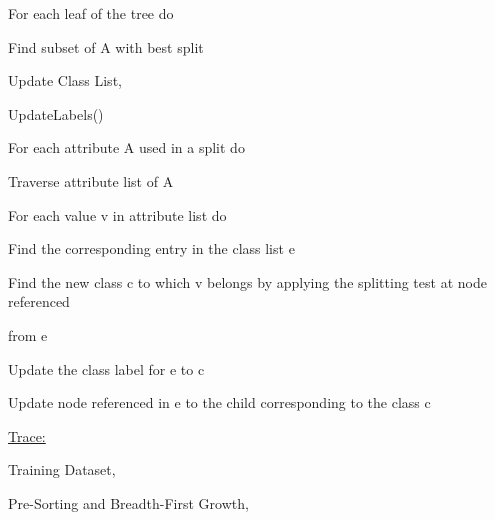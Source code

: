 \documentclass[12pt]{article}
\renewcommand{\_}{\kern-1.5pt\textunderscore\kern-1.5pt}
\begin{document}
\begin{enumerate}
\tab \tab For each leaf of the tree do\par

\tab \tab \tab Find subset of A with best split\par

Update Class List, \par

UpdateLabels()\par

For each attribute A used in a split do\par

\tab Traverse attribute list of A\par

\tab For each value v in attribute list do\par

\tab \tab Find the corresponding entry in the class list e\par

\tab \tab Find the new class c to which v belongs by applying the splitting test at node referenced\par

\begin{adjustwidth}{0.5in}{0.0in}
from e\par

\end{adjustwidth}

\begin{adjustwidth}{0.5in}{0.0in}
Update the class label for e to c\par

\end{adjustwidth}

\begin{adjustwidth}{0.5in}{0.0in}
Update node referenced in e to the child corresponding to the class c\par

\end{adjustwidth}

{\fontsize{14pt}{16.8pt}\selectfont \uline{Trace:}\par}\par

Training Dataset, \par

\par


\vspace{\baselineskip}
Pre-Sorting and Breadth-First Growth, \par


\end{enumerate}
\end{document}
